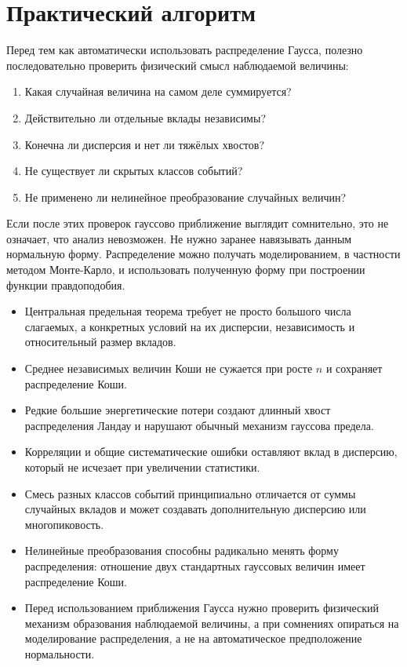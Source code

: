 \documentclass[
  russian,
  12pt,
  a4paper,
  a4paper,
  openany]{scrbook}
\providecommand{\tightlist}{%
  \setlength{\itemsep}{0pt}\setlength{\parskip}{0pt}}
\begin{document}
\section{Практический
алгоритм}\label{ux43fux440ux430ux43aux442ux438ux447ux435ux441ux43aux438ux439-ux430ux43bux433ux43eux440ux438ux442ux43c}

Перед тем как автоматически использовать распределение Гаусса, полезно
последовательно проверить физический смысл наблюдаемой величины:

\begin{enumerate}
\def\labelenumi{\arabic{enumi}.}
\tightlist
\item
  Какая случайная величина на самом деле суммируется?
\item
  Действительно ли отдельные вклады независимы?
\item
  Конечна ли дисперсия и нет ли тяжёлых хвостов?
\item
  Не существует ли скрытых классов событий?
\item
  Не применено ли нелинейное преобразование случайных величин?
\end{enumerate}

Если после этих проверок гауссово приближение выглядит сомнительно, это
не означает, что анализ невозможен. Не нужно заранее навязывать данным
нормальную форму. Распределение можно получать моделированием, в
частности методом Монте-Карло, и использовать полученную форму при
построении функции правдоподобия.

\begin{bookchaptersummary}

\begin{itemize}
\tightlist
\item
  Центральная предельная теорема требует не просто большого числа
  слагаемых, а конкретных условий на их дисперсии, независимость и
  относительный размер вкладов.
\item
  Среднее независимых величин Коши не сужается при росте \(n\) и
  сохраняет распределение Коши.
\item
  Редкие большие энергетические потери создают длинный хвост
  распределения Ландау и нарушают обычный механизм гауссова предела.
\item
  Корреляции и общие систематические ошибки оставляют вклад в дисперсию,
  который не исчезает при увеличении статистики.
\item
  Смесь разных классов событий принципиально отличается от суммы
  случайных вкладов и может создавать дополнительную дисперсию или
  многопиковость.
\item
  Нелинейные преобразования способны радикально менять форму
  распределения: отношение двух стандартных гауссовых величин имеет
  распределение Коши.
\item
  Перед использованием приближения Гаусса нужно проверить физический
  механизм образования наблюдаемой величины, а при сомнениях опираться
  на моделирование распределения, а не на автоматическое предположение
  нормальности.
\end{itemize}

\end{bookchaptersummary}
\end{document}
